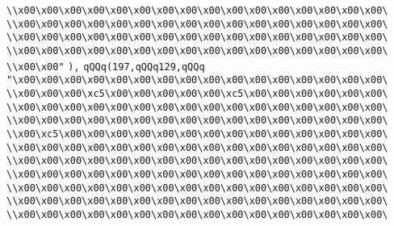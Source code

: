 \verb|\\x00\x00\x00\x00\x00\x00\x00\x00\x00\x00\x00\x00\x00\x00\x00\x00\|\newline
\verb|\\x00\x00\x00\x00\x00\x00\x00\x00\x00\x00\x00\x00\x00\x00\x00\x00\|\newline
\verb|\\x00\x00\x00\x00\x00\x00\x00\x00\x00\x00\x00\x00\x00\x00\x00\x00\|\newline
\verb|\\x00\x00\x00\x00\x00\x00\x00\x00\x00\x00\x00\x00\x00\x00\x00\x00\|\newline
\verb|\\x00\x00"|\newline
\verb|),|\newline
\verb|qQQq(197,qQQq129,qQQq|\newline
\verb|"\x00\x00\x00\x00\x00\x00\x00\x00\x00\x00\x00\x00\x00\x00\x00\x00\|\newline
\verb|\\x00\x00\x00\xc5\x00\x00\x00\x00\x00\xc5\x00\x00\x00\x00\x00\x00\|\newline
\verb|\\x00\x00\x00\x00\x00\x00\x00\x00\x00\x00\x00\x00\x00\x00\x00\x00\|\newline
\verb|\\x00\x00\x00\x00\x00\x00\x00\x00\x00\x00\x00\x00\x00\x00\x00\x00\|\newline
\verb|\\x00\xc5\x00\x00\x00\x00\x00\x00\x00\x00\x00\x00\x00\x00\x00\x00\|\newline
\verb|\\x00\x00\x00\x00\x00\x00\x00\x00\x00\x00\x00\x00\x00\x00\x00\x00\|\newline
\verb|\\x00\x00\x00\x00\x00\x00\x00\x00\x00\x00\x00\x00\x00\x00\x00\x00\|\newline
\verb|\\x00\x00\x00\x00\x00\x00\x00\x00\x00\x00\x00\x00\x00\x00\x00\x00\|\newline
\verb|\\x00\x00\x00\x00\x00\x00\x00\x00\x00\x00\x00\x00\x00\x00\x00\x00\|\newline
\verb|\\x00\x00\x00\x00\x00\x00\x00\x00\x00\x00\x00\x00\x00\x00\x00\x00\|\newline
\verb|\\x00\x00\x00\x00\x00\x00\x00\x00\x00\x00\x00\x00\x00\x00\x00\x00\|\newline
